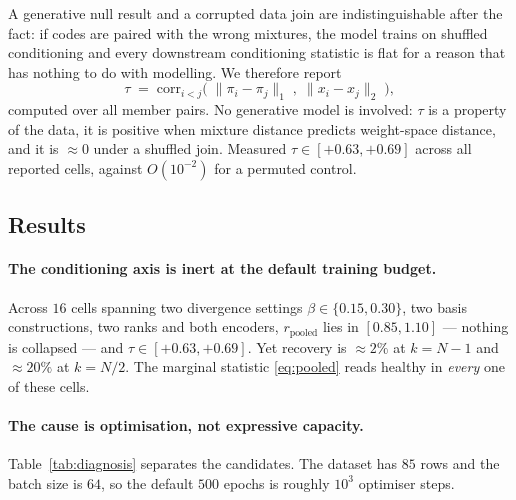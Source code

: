 A generative null result and a corrupted data join are indistinguishable after the
fact: if codes are paired with the wrong mixtures, the model trains on shuffled
conditioning and every downstream conditioning statistic is flat for a reason that
has nothing to do with modelling. We therefore report
%
\begin{equation}
\tau \;=\; \mathrm{corr}_{i<j}\Big(\; \|\pi_i - \pi_j\|_1 \;,\; \|x_i - x_j\|_2 \;\Big),
\end{equation}
%
computed over all member pairs. No generative model is involved: $\tau$ is a property
of the data, it is positive when mixture distance predicts weight-space distance, and
it is $\approx 0$ under a shuffled join. Measured $\tau \in [{+}0.63, {+}0.69]$ across
all reported cells, against $O(10^{-2})$ for a permuted control.

\subsection{Results}
\label{app:results}

\paragraph{The conditioning axis is inert at the default training budget.}
Across $16$ cells spanning two divergence settings $\beta \in \{0.15, 0.30\}$, two
basis constructions, two ranks and both encoders, $r_{\mathrm{pooled}}$ lies in
$[0.85, 1.10]$ --- nothing is collapsed --- and $\tau \in [{+}0.63, {+}0.69]$. Yet
recovery is $\approx 2\%$ at $k = N{-}1$ and $\approx 20\%$ at $k = N/2$. The marginal
statistic \eqref{eq:pooled} reads healthy in \emph{every} one of these cells.

\paragraph{The cause is optimisation, not expressive capacity.}
Table~\ref{tab:diagnosis} separates the candidates. The dataset has $85$ rows and the
batch size is $64$, so the default $500$ epochs is roughly $10^3$ optimiser steps.

